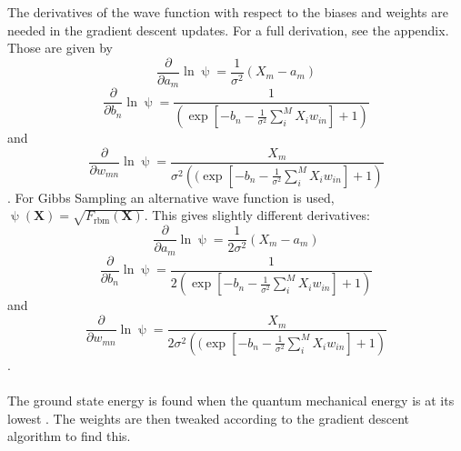 The derivatives of the wave function with respect to the biases and weights are needed in the gradient descent updates. For a full derivation, see the appendix. Those are given by 
\begin{equation}
    \frac{\partial}{\partial a_m}\ln \uppsi = \frac{1}{\sigma^2}(X_m - a_m)
\end{equation}
\begin{equation}
    \frac{\partial}{\partial b_n}\ln \uppsi = \frac{1}{\left(\exp \left[-b_n - \frac{1}{\sigma^2}\sum_i^MX_iw_{in}\right]+1\right)}
\end{equation}
and 
\begin{equation}
    \frac{\partial }{\partial w_{mn}}\ln \uppsi = \frac{X_m}{\sigma^2\left(  (\exp \left[-b_n - \frac{1}{\sigma^2}\sum_i^MX_iw_{in}\right]+1 \right)}
\end{equation}
\cite{mhj_ml}.
For Gibbs Sampling an alternative wave function is used, $\uppsi(\boldsymbol{X}) = \sqrt{F_{\text{rbm}}(\boldsymbol{X})}$. This gives slightly different derivatives:
\begin{equation}
    \frac{\partial}{\partial a_m}\ln \uppsi = \frac{1}{2\sigma^2}(X_m - a_m)
\end{equation}
\begin{equation}
    \frac{\partial}{\partial b_n}\ln \uppsi = \frac{1}{2\left(\exp \left[-b_n - \frac{1}{\sigma^2}\sum_i^MX_iw_{in}\right]+1\right)}
\end{equation}
and 
\begin{equation}
    \frac{\partial }{\partial w_{mn}}\ln \uppsi = \frac{X_m}{2\sigma^2\left(  (\exp \left[-b_n - \frac{1}{\sigma^2}\sum_i^MX_iw_{in}\right]+1 \right)}
\end{equation}
\cite{mhj_ml}.
\\
\\
The ground state energy is found when the quantum mechanical energy is at its lowest \cite{mhj_vmc}. The weights are then tweaked according to the gradient descent algorithm to find this.

\newpage